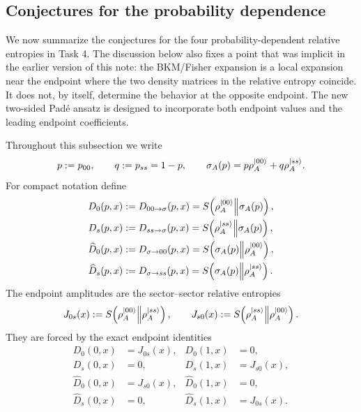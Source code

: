 \documentclass{article}
\theoremstyle{plain}
\theoremstyle{definition}
\theoremstyle{plain}
\begin{document}
\subsection{Conjectures for the probability dependence}
\label{subsec:task4_conjectures}

We now summarize the conjectures for the four probability-dependent relative entropies in
Task 4.  The discussion below also fixes a point that was implicit in the earlier version of
this note: the BKM/Fisher expansion is a local expansion near the endpoint where the two density
matrices in the relative entropy coincide.  It does not, by itself, determine the behavior at the
opposite endpoint.  The new two-sided Pad\'e ansatz is designed to incorporate both endpoint
values and the leading endpoint coefficients.

Throughout this subsection we write
\begin{equation}
    p:=p_{00},\qquad q:=p_{ss}=1-p,\qquad
    \sigma_A(p)=p\rho_A^{\ket{00}}+q\rho_A^{\ket{ss}} .
\end{equation}
For compact notation define
\begin{equation}
\begin{aligned}
    D_0(p,x)&:=D_{00\rightarrow\sigma}(p,x)
    =S\!\left(\rho_A^{\ket{00}}\middle\|\sigma_A(p)\right),\\
    D_s(p,x)&:=D_{ss\rightarrow\sigma}(p,x)
    =S\!\left(\rho_A^{\ket{ss}}\middle\|\sigma_A(p)\right),\\
    \widehat D_0(p,x)&:=D_{\sigma\rightarrow00}(p,x)
    =S\!\left(\sigma_A(p)\middle\|\rho_A^{\ket{00}}\right),\\
    \widehat D_s(p,x)&:=D_{\sigma\rightarrow ss}(p,x)
    =S\!\left(\sigma_A(p)\middle\|\rho_A^{\ket{ss}}\right).
\end{aligned}
\end{equation}
The endpoint amplitudes are the sector--sector relative entropies
\begin{equation}
    J_{0s}(x):=S\!\left(\rho_A^{\ket{00}}\middle\|\rho_A^{\ket{ss}}\right),
    \qquad
    J_{s0}(x):=S\!\left(\rho_A^{\ket{ss}}\middle\|\rho_A^{\ket{00}}\right).
\end{equation}
They are forced by the exact endpoint identities
\begin{equation}
\begin{aligned}
    D_0(0,x)&=J_{0s}(x),       & D_0(1,x)&=0,\\
    D_s(0,x)&=0,              & D_s(1,x)&=J_{s0}(x),\\
    \widehat D_0(0,x)&=J_{s0}(x), & \widehat D_0(1,x)&=0,\\
    \widehat D_s(0,x)&=0,        & \widehat D_s(1,x)&=J_{0s}(x).
\end{aligned}
\label{eq:task4_endpoint_identities}
\end{equation}
\end{document}
